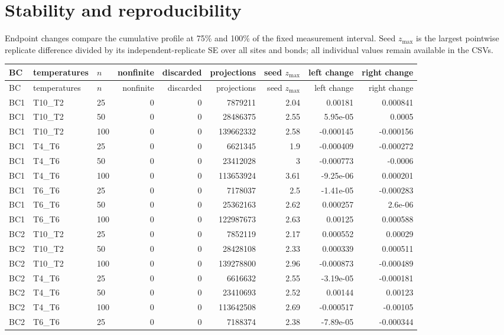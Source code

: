 \documentclass[10pt]{article}
\begin{document}
\clearpage
\section*{Stability and reproducibility}
Endpoint changes compare the cumulative profile at 75\% and 100\% of the
fixed measurement interval.  Seed $z_{\max}$ is the largest pointwise
replicate difference divided by its independent-replicate SE over all sites and
bonds; all individual values remain available in the CSVs.
\begin{longtable}{lllrrrrrr}
\toprule BC & temperatures & $n$ & nonfinite & discarded & projections & seed $z_{\max}$ & left change & right change\\
\midrule\endfirsthead
\toprule BC & temperatures & $n$ & nonfinite & discarded & projections & seed $z_{\max}$ & left change & right change\\
\midrule\endhead
BC1 & T10\_T2 & 25 & 0 & 0 & 7879211 & 2.04 & 0.00181 & 0.000841 \\
BC1 & T10\_T2 & 50 & 0 & 0 & 28486375 & 2.55 & 5.95e-05 & 0.0005 \\
BC1 & T10\_T2 & 100 & 0 & 0 & 139662332 & 2.58 & -0.000145 & -0.000156 \\
BC1 & T4\_T6 & 25 & 0 & 0 & 6621345 & 1.9 & -0.000409 & -0.000272 \\
BC1 & T4\_T6 & 50 & 0 & 0 & 23412028 & 3 & -0.000773 & -0.0006 \\
BC1 & T4\_T6 & 100 & 0 & 0 & 113653924 & 3.61 & -9.25e-06 & 0.000201 \\
BC1 & T6\_T6 & 25 & 0 & 0 & 7178037 & 2.5 & -1.41e-05 & -0.000283 \\
BC1 & T6\_T6 & 50 & 0 & 0 & 25362163 & 2.62 & 0.000257 & 2.6e-06 \\
BC1 & T6\_T6 & 100 & 0 & 0 & 122987673 & 2.63 & 0.00125 & 0.000588 \\
BC2 & T10\_T2 & 25 & 0 & 0 & 7852119 & 2.17 & 0.000552 & 0.00029 \\
BC2 & T10\_T2 & 50 & 0 & 0 & 28428108 & 2.33 & 0.000339 & 0.000511 \\
BC2 & T10\_T2 & 100 & 0 & 0 & 139278800 & 2.96 & -0.000873 & -0.000489 \\
BC2 & T4\_T6 & 25 & 0 & 0 & 6616632 & 2.55 & -3.19e-05 & -0.000181 \\
BC2 & T4\_T6 & 50 & 0 & 0 & 23410693 & 2.52 & 0.00144 & 0.00123 \\
BC2 & T4\_T6 & 100 & 0 & 0 & 113642508 & 2.69 & -0.000517 & -0.00105 \\
BC2 & T6\_T6 & 25 & 0 & 0 & 7188374 & 2.38 & -7.89e-05 & -0.000344 \\

\end{longtable}
\end{document}
